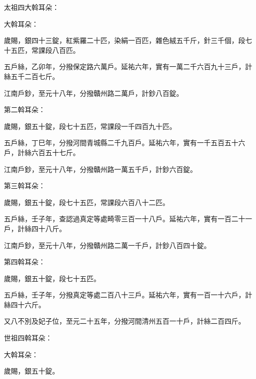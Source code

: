 \begin{pinyinscope}
 太祖四大斡耳朵：



 大斡耳朵：



 歲賜，銀四十三錠，紅紫羅二十匹，染絹一百匹，雜色絨五千斤，針三千個，段七十五匹，常課段八百匹。



 五戶絲，乙卯年，分撥保定路六萬戶。延祐六年，實有一萬二千六百九十三戶，計絲五千二百七斤。



 江南戶鈔，至元十八年，分撥贛州路二萬戶，計鈔八百錠。



 第二斡耳朵：



 歲賜，銀五十錠，段七十五匹，常課段一千四百九十匹。



 五戶絲，丁巳年，分撥河間青城縣二千九百戶。延祐六年，實有一千五百五十六戶，計絲六百五十七斤。



 江南戶鈔，至元十八年，分撥贛州路一萬五千戶，計鈔六百錠。



 第三斡耳朵：



 歲賜，銀五十錠，段七十五匹，常課段六百八十二匹。



 五戶絲，壬子年，查認過真定等處畸零三百一十八戶。延祐六年，實有一百二十一戶，計絲四十八斤。



 江南戶鈔，至元十八年，分撥贛州路二萬一千戶，計鈔八百四十錠。



 第四斡耳朵：



 歲賜，銀五十錠，段七十五匹。



 五戶絲，壬子年，分撥真定等處二百八十三戶。延祐六年，實有一百一十六戶，計絲四十六斤。



 又八不別及妃子位，至元二十五年，分撥河間清州五百一十戶，計絲二百四斤。



 世祖四斡耳朵：



 大斡耳朵：



 歲賜，銀五十錠。




\end{pinyinscope}
